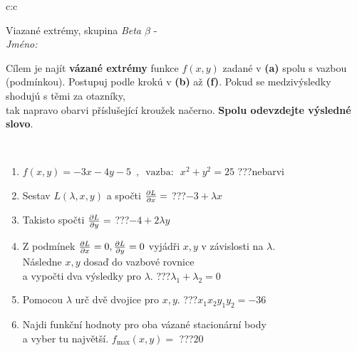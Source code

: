 \documentclass[10pt]{report}
\begin{document}
\begin{tabular}{c:c}
\begin{minipage}[c][104.5mm][t]{0.5\linewidth}
\begin{center}
\vspace{7mm}
{\huge Viazané extrémy, skupina \textit{Beta $\beta$} -}\\[5mm]
\textit{Jméno:}\phantom{xxxxxxxxxxxxxxxxxxxxxxxxxxxxxxxxxxxxxxxxxxxxxxxxxxxxxxxxxxxxxxxxx}\\[5mm]
\begin{minipage}{0.95\linewidth}
\begin{center}
Cílem je najít \textbf{vázané extrémy} funkce $f(x,y)$ zadané v \textbf{(a)} spolu s vazbou (podmínkou). Postupuj podle krokú v \textbf{(b)} až \textbf{(f)}. Pokud se medzivýsledky shodujú s těmi za otazníky,\\tak napravo obarvi příslušející kroužek načerno. \textbf{Spolu odevzdejte výsledné slovo}.
\end{center}
\end{minipage}
\\[1mm]
\begin{minipage}{0.79\linewidth}
\begin{center}
\begin{varwidth}{\linewidth}
\begin{enumerate}
\normalsize
\item $f(x,y)=-3x-4y-5 \enspace , \enspace \mathrm{vazba:} \enspace x^2+y^2=25$\quad \dotfill\; ???\;\dotfill \quad nebarvi
\item Sestav $L(\lambda,x,y)$ a spočti $\pdv{L}{x}=$\quad \dotfill\; ???\;\dotfill \quad $-3+\lambda x$
\item Takisto spočti $\pdv{L}{y}=$\quad \dotfill\; ???\;\dotfill \quad $-4+2\lambda y$
\item Z podmínek $\pdv{L}{x}=0 , \pdv{L}{y}=0$ vyjádři $x,y$ v závislosti na $\lambda$.\\ \phantom{xxxxxx}Následne $x,y$ dosaď do vazbové rovnice\\ \phantom{xxxxxx}a vypočti dva výsledky pro $\lambda$.\quad \dotfill\; ???\;\dotfill \quad $\lambda_1+\lambda_2=0$
\item Pomocou $\lambda$ urč dvě dvojice pro $x,y$.\quad \dotfill\; ???\;\dotfill \quad $x_1 x_2 y_1 y_2=-36$
\item Najdi funkční hodnoty pro oba vázané stacionární body\\ \phantom{xxxxxx}a vyber tu najvětší. $f_{\text{max}}(x,y)=$\quad \dotfill\; ???\;\dotfill \quad $20$

\end{enumerate}
\end{varwidth}
\end{center}
\end{minipage}
\end{center}
\end{minipage}
\end{tabular}
\end{document}
